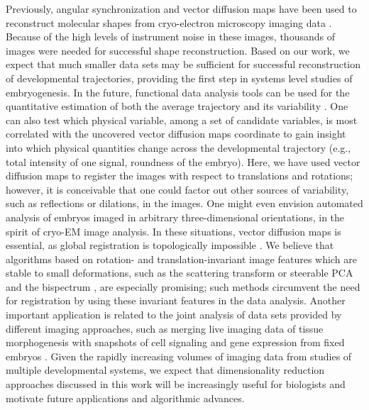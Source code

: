 \documentclass{pnastwo}
\begin{document}
\begin{article}
{\color{red} Previously, angular synchronization and vector diffusion maps have been used to reconstruct molecular shapes from cryo-electron microscopy imaging data \cite{singer2012vector, zhao2014rotationally, singer2011viewing}.} 
%
Because of the high levels of instrument noise in these images, thousands of images were needed for successful shape reconstruction. 
%
Based on our work, we expect that much smaller data sets may be sufficient for successful reconstruction of developmental trajectories, providing the first step in systems level studies of embryogenesis. 
%
In the future, functional data analysis tools can be used for the quantitative estimation of both the average trajectory and its variability \cite{silverman2005functional}.  
%
One can also test which physical variable, among a set of candidate variables, is most correlated with the uncovered vector diffusion maps coordinate to gain insight into which physical quantities change across the developmental trajectory (e.g., total intensity of one signal, roundness of the embryo).
%
Here, we have used vector diffusion maps to register the images with respect to translations and rotations; however, it is conceivable that one could factor out other sources of variability, such as reflections \cite{singer2012vector, goemans1995improved, bandeira2013cheeger} or dilations, in the images.
%
One might even envision automated analysis of embryos imaged in arbitrary three-dimensional orientations, in the spirit of cryo-EM image analysis.
%
{\color{red} In these situations, vector diffusion maps is essential, as global registration is topologically impossible \cite{zhao2014rotationally}.}
%
{\color{red} We believe that algorithms based on rotation- and translation-invariant image features which are stable to small deformations, such as the scattering transform \cite{mallat2012group} or steerable PCA and the bispectrum \cite{zhao2014rotationally}, are especially promising; such methods circumvent the need for registration by using these invariant features in the data analysis.}
%
Another important application is related to the joint analysis of data sets provided by different imaging approaches, such as merging live imaging data of tissue morphogenesis with snapshots of cell signaling and gene expression from fixed embryos \cite{krzic2012multiview, ichikawa2014live, rubel2010coupling}. 
%
Given the rapidly increasing volumes of imaging data from studies of multiple developmental systems, we expect that dimensionality reduction approaches discussed in this work will be increasingly useful for biologists and motivate future applications and algorithmic advances. 
  


\end{article}
\end{document}
